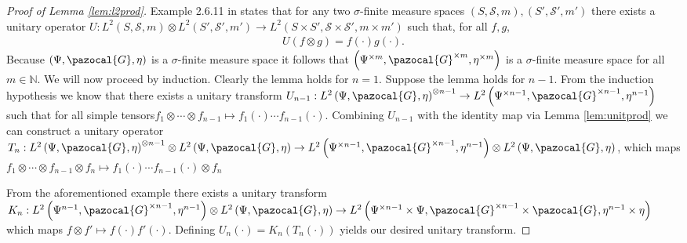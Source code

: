 \documentclass{article} %
\def\sG{\pazocal{G}}
\theoremstyle{definition}
\begin{document}
\begin{proof}[Proof of Lemma \ref{lem:l2prod}]
 Example 2.6.11 in \cite{kadison83} states that for any two $\sigma$-finite measure spaces $\left( S,\mathscr{S}, m \right), \left( S',\mathscr{S}', m' \right)$ there exists a unitary operator $U: L^2\left( S,\mathscr{S}, m \right) \otimes L^2 \left( S',\mathscr{S'}, m' \right) \to L^2\left( S\times S', \mathscr{S}\times \mathscr{S'}, m\times m' \right)$ such that, for all $f,g$,
\begin{eqnarray*}
	U(f\otimes g) = f(\cdot)g(\cdot).
\end{eqnarray*}
Because $\left( \Psi, \sG, \eta \right)$ is a $\sigma$-finite measure space it follows that $\left( \Psi^{\times m}, \sG^{\times m}, \eta^{\times m} \right)$ is a $\sigma$-finite measure space for all $m\in \mathbb{N}$. We will now proceed by induction. Clearly the lemma holds for $n=1$. Suppose the lemma holds for $n-1$. From the induction hypothesis we know that there exists a unitary transform $U_{n-1}: L^2\left( \Psi, \sG, \eta \right)^{\otimes n-1} \to L^2 \left( \Psi^{\times n-1} ,\sG ^{\times n-1}  , \eta^{n-1} \right)$ such that for all simple tensors$ f_1\otimes\cdots \otimes f_{n-1} \mapsto f_1(\cdot)\cdots f_{n-1}\left( \cdot \right)$. Combining $U_{n-1}$ with the identity map via Lemma \ref{lem:unitprod} we can construct a unitary operator $T_n: L^2\left( \Psi, \sG, \eta \right)^{\otimes n-1} \otimes L^2\left( \Psi, \sG, \eta \right) \to L^2 \left( \Psi^{\times n-1} ,\sG ^{\times n-1}  , \eta^{n-1} \right) \otimes L^2\left( \Psi, \sG, \eta \right)$, which maps $f_1\otimes\cdots\otimes f_{n-1}  \otimes f_n \mapsto f_1(\cdot)\cdots f_{n-1}(\cdot) \otimes f_n$

 From the aforementioned example there exists a unitary transform $K_n:L^2\left( \Psi^{n-1},\sG^{\times n-1}, \eta^{n-1} \right)\otimes L^2\left( \Psi,\sG, \eta \right)\to L^2 \left( \Psi^{\times n-1} \times \Psi,\sG ^{\times n-1} \times \sG , \eta^{n-1}\times \eta\right)$ which maps $f\otimes f' \mapsto f\left( \cdot \right)f'\left( \cdot \right)$. Defining $U_n(\cdot)= K_n\left( T_n \left( \cdot \right) \right)$ yields our desired unitary transform.
\end{proof}
\end{document}
